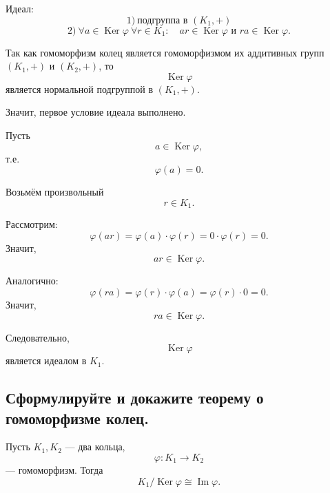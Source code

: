 \begin{Proof}
    Идеал:
    \[
        1)\ \text{подгруппа в } (K_1,+)
    \]
    \[
        2)\ \forall a \in \operatorname{Ker}\varphi\ \forall r \in K_1:
        \quad ar \in \operatorname{Ker}\varphi
        \text{ и }
        ra \in \operatorname{Ker}\varphi.
    \]

    Так как гомоморфизм колец является гомоморфизмом их аддитивных групп
    $(K_1,+)$ и $(K_2,+)$, то
    \[
        \operatorname{Ker}\varphi
    \]
    является нормальной подгруппой в $(K_1,+)$.
    
    Значит, первое условие идеала выполнено.

    Пусть
    \[
        a \in \operatorname{Ker}\varphi,
    \]
    т.е.
    \[
        \varphi(a)=0.
    \]

    Возьмём произвольный
    \[
        r \in K_1.
    \]

    Рассмотрим:
    \[
        \varphi(ar)
        =
        \varphi(a)\cdot \varphi(r)
        =
        0\cdot \varphi(r)
        =
        0.
    \]
    Значит,
    \[
        ar \in \operatorname{Ker}\varphi.
    \]

    Аналогично:
    \[
        \varphi(ra)
        =
        \varphi(r)\cdot \varphi(a)
        =
        \varphi(r)\cdot 0
        =
        0.
    \]
    Значит,
    \[
        ra \in \operatorname{Ker}\varphi.
    \]

    Следовательно,
    \[
        \operatorname{Ker}\varphi
    \]
    является идеалом в $K_1$.
\end{Proof}

\subsection{Сформулируйте и докажите теорему о гомоморфизме колец.}

\begin{theorem}
    Пусть $K_1, K_2$ --- два кольца,
    \[
        \varphi: K_1 \to K_2
    \]
    --- гомоморфизм. Тогда
    \[
        K_1 / \operatorname{Ker}\varphi \cong \operatorname{Im}\varphi.
    \]
\end{theorem}

